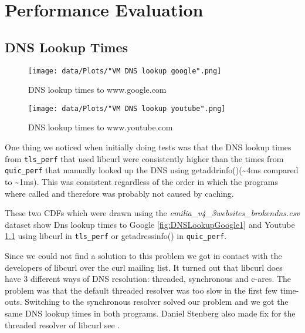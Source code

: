 \chapter{Performance Evaluation}\label{chapter_performance_evaluation}

\section{DNS Lookup Times}
\label{section:dns_lookup_times}

\begin{figure}[!thb]
	\centering
	\begin{minipage}{.45\textwidth}
		\centering
		\texttt{[image: data/Plots/"VM DNS lookup google".png]}
		\caption{DNS lookup times to www.google.com}
  		\label{fig:DNSLookupGoogle1}
  	\end{minipage}%
  	\hspace{0.5cm}
  	\begin{minipage}{.45\textwidth}
		\centering
		\texttt{[image: data/Plots/"VM DNS lookup youtube".png]}
		\caption{DNS lookup times to www.youtube.com}
  		\label{fig:DNSLookupYoutube1}
  	\end{minipage}
\end{figure}

One thing we noticed when initially doing tests was that the DNS lookup times from \texttt{tls\_perf} that used libcurl were consistently higher than the times from \texttt{quic\_perf} that manually looked up the DNS using getaddrinfo()(\textasciitilde 4ms compared to \textasciitilde 1ms).
This was consistent regardless of the order in which the programs where called and therefore was probably not caused by caching.

These two CDFs which were drawn using the \textit{emilia\_v4\_3websites\_brokendns.csv} dataset show Dns lookup times to Google \ref{fig:DNSLookupGoogle1} and Youtube \ref{fig:DNSLookupYoutube1} using libcurl in \texttt{tls\_perf} or getadressinfo() in \texttt{quic\_perf}.

Since we could not find a solution to this problem we got in contact with the developers of libcurl over the curl mailing list.
It turned out that libcurl does have 3 different ways of DNS resolution: threaded, synchronous and c-ares.
The problem was that the default threaded resolver was too slow in the first few time-outs.
Switching to the synchronous resolver solved our problem and we got the same DNS lookup times in both programs.
Daniel Stenberg also made fix for the threaded resolver of libcurl see  \cite{Link:curlFix}.

